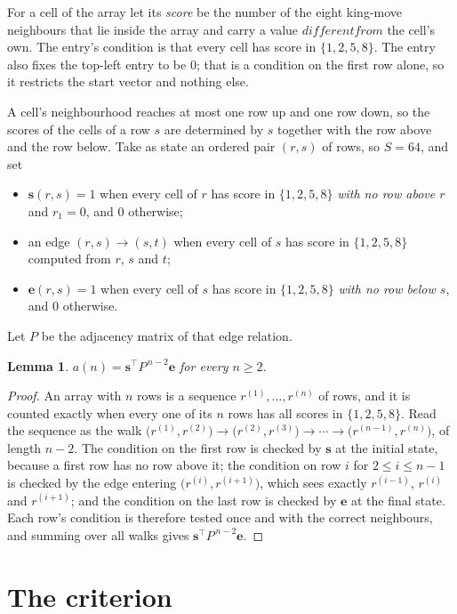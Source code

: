 \documentclass[11pt,a4paper]{article}
\theoremstyle{plain}
\newtheorem{lemma}[theorem]{Lemma}
\theoremstyle{definition}
\begin{document}
For a cell of the array let its \emph{score} be the number of the eight king-move neighbours that lie inside
the array and carry a value $different from$ the cell's own. The entry's condition is that every cell
has score in $\{1,2,5,8\}$. The entry also fixes the top-left entry to be $0$; that is a condition on the first row alone, so it restricts the start vector and nothing else.

A cell's neighbourhood reaches at most one row up and one row down, so the scores of the
cells of a row $s$ are determined by $s$ together with the row above and the row below.
Take as state an ordered pair $(r,s)$ of rows, so $S=64$, and set
\begin{itemize}
\item $\mathbf{s}(r,s)=1$ when every cell of $r$ has score in $\{1,2,5,8\}$ \emph{with no row
above $r$} and $r_1=0$, and $0$ otherwise;
\item an edge $(r,s)\to(s,t)$ when every cell of $s$ has score in $\{1,2,5,8\}$ computed from
$r$, $s$ and $t$;
\item $\mathbf{e}(r,s)=1$ when every cell of $s$ has score in $\{1,2,5,8\}$ \emph{with no row
below $s$}, and $0$ otherwise.
\end{itemize}
Let $P$ be the adjacency matrix of that edge relation.

\begin{lemma}\label{lem:walk}
$a(n)=\mathbf{s}^{\!\top}P^{\,n-2}\mathbf{e}$ for every $n\ge2$.
\end{lemma}

\begin{proof}
An array with $n$ rows is a sequence $r^{(1)},\dots,r^{(n)}$ of rows, and it is counted
exactly when every one of its $n$ rows has all scores in $\{1,2,5,8\}$. Read the sequence as the
walk $\bigl(r^{(1)},r^{(2)}\bigr)\to\bigl(r^{(2)},r^{(3)}\bigr)\to\cdots\to
\bigl(r^{(n-1)},r^{(n)}\bigr)$, of length $n-2$. The condition on the first row is
checked by $\mathbf{s}$ at the initial state, because a first row has no row above it; the
condition on row $i$ for $2\le i\le n-1$ is checked by the edge entering
$\bigl(r^{(i)},r^{(i+1)}\bigr)$, which sees exactly $r^{(i-1)}$, $r^{(i)}$ and
$r^{(i+1)}$; and the condition on the last row is checked by $\mathbf{e}$ at the final
state. Each row's condition is therefore tested once and with the correct neighbours, and
summing over all walks gives $\mathbf{s}^{\!\top}P^{\,n-2}\mathbf{e}$.
\end{proof}

\section{The criterion}
\end{document}
